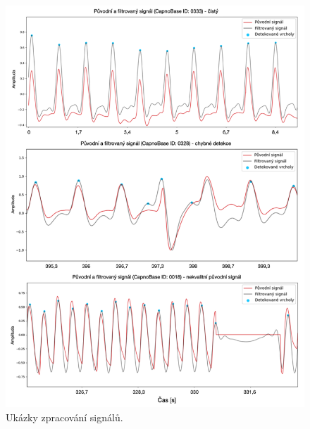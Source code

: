 \begin{figure}[t]
	\centering
	\includegraphics[width=1\textwidth]{./obrazky/MyFilterPeaks.png}
	\caption[Vlastní zpracování signálů]{Ukázky zpracování signálů.}
	\label{fig:filter-peaks}
\end{figure}